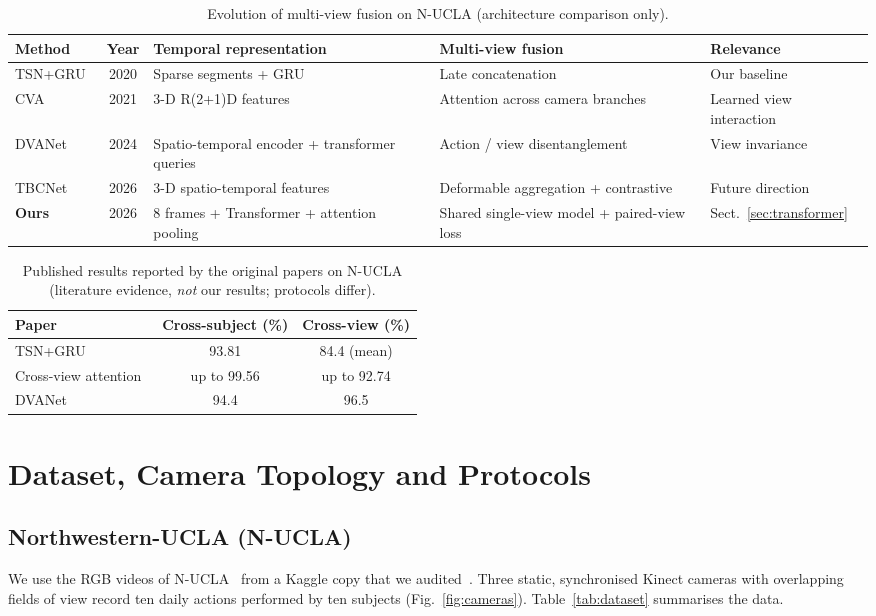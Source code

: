 \documentclass[runningheads]{llncs}
\begin{document}
\begin{table}[t]
\caption{Evolution of multi-view fusion on N-UCLA (architecture comparison only).}\label{tab:evolution}
\centering
\scriptsize
\begin{tabularx}{\textwidth}{@{}p{2.25cm}c X X p{1.65cm}@{}}
\toprule
Method & Year & Temporal representation & Multi-view fusion & Relevance \\
\midrule
TSN+GRU~\cite{bui2020} & 2020 & Sparse segments + GRU & Late concatenation & Our baseline \\
CVA~\cite{nguyen2021} & 2021 & 3-D R(2+1)D features & Attention across camera branches & Learned view interaction \\
DVANet~\cite{siddiqui2024} & 2024 & Spatio-temporal encoder + transformer queries & Action / view disentanglement & View invariance \\
TBCNet~\cite{yang2026} & 2026 & 3-D spatio-temporal features & Deformable aggregation + contrastive & Future direction \\
\textbf{Ours} & 2026 & 8 frames + Transformer + attention pooling & Shared single-view model + paired-view loss & Sect.~\ref{sec:transformer} \\
\bottomrule
\end{tabularx}
\end{table}

\begin{table}[t]
\caption{Published results reported by the original papers on N-UCLA (literature evidence, \emph{not} our results; protocols differ).}\label{tab:published}
\centering
\small
\begin{tabular}{lcc}
\toprule
Paper & Cross-subject (\%) & Cross-view (\%) \\
\midrule
TSN+GRU~\cite{bui2020} & 93.81 & 84.4 (mean) \\
Cross-view attention~\cite{nguyen2021} & up to 99.56 & up to 92.74 \\
DVANet~\cite{siddiqui2024} & 94.4 & 96.5 \\
\bottomrule
\end{tabular}
\end{table}

\section{Dataset, Camera Topology and Protocols}
\subsection{Northwestern-UCLA (N-UCLA)}
We use the RGB videos of N-UCLA~\cite{wang2014} from a Kaggle copy that we audited~\cite{raj2026}. Three static, synchronised Kinect cameras with overlapping fields of view record ten daily actions performed by ten subjects (Fig.~\ref{fig:cameras}). Table~\ref{tab:dataset} summarises the data.
\end{document}

